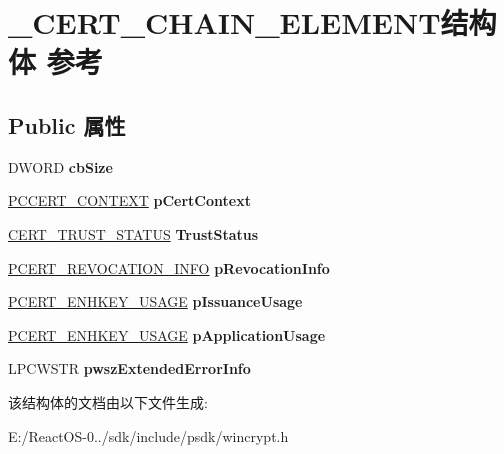\hypertarget{struct___c_e_r_t___c_h_a_i_n___e_l_e_m_e_n_t}{}\section{\+\_\+\+C\+E\+R\+T\+\_\+\+C\+H\+A\+I\+N\+\_\+\+E\+L\+E\+M\+E\+N\+T结构体 参考}
\label{struct___c_e_r_t___c_h_a_i_n___e_l_e_m_e_n_t}
\subsection*{Public 属性}
\begin{DoxyCompactItemize}
\item 
\mbox{\label{struct___c_e_r_t___c_h_a_i_n___e_l_e_m_e_n_t_a4c97d184737fedf93d6b1e325b2a3efd}} 
D\+W\+O\+RD {\bfseries cb\+Size}
\item 
\mbox{\label{struct___c_e_r_t___c_h_a_i_n___e_l_e_m_e_n_t_a64d8a3bf08c5d59ccf4c4d46cf072095}} 
\hyperlink{struct___c_e_r_t___c_o_n_t_e_x_t}{P\+C\+C\+E\+R\+T\+\_\+\+C\+O\+N\+T\+E\+XT} {\bfseries p\+Cert\+Context}
\item 
\mbox{\label{struct___c_e_r_t___c_h_a_i_n___e_l_e_m_e_n_t_ab864c5dae3d182befc1748ee7c73c1cd}} 
\hyperlink{struct___c_e_r_t___t_r_u_s_t___s_t_a_t_u_s}{C\+E\+R\+T\+\_\+\+T\+R\+U\+S\+T\+\_\+\+S\+T\+A\+T\+US} {\bfseries Trust\+Status}
\item 
\mbox{\label{struct___c_e_r_t___c_h_a_i_n___e_l_e_m_e_n_t_a25f1b263b2f47f70027a349b5d27efaf}} 
\hyperlink{struct___c_e_r_t___r_e_v_o_c_a_t_i_o_n___i_n_f_o}{P\+C\+E\+R\+T\+\_\+\+R\+E\+V\+O\+C\+A\+T\+I\+O\+N\+\_\+\+I\+N\+FO} {\bfseries p\+Revocation\+Info}
\item 
\mbox{\label{struct___c_e_r_t___c_h_a_i_n___e_l_e_m_e_n_t_a8aa7690eba349307901cb5bb7f0410e8}} 
\hyperlink{struct___c_t_l___u_s_a_g_e}{P\+C\+E\+R\+T\+\_\+\+E\+N\+H\+K\+E\+Y\+\_\+\+U\+S\+A\+GE} {\bfseries p\+Issuance\+Usage}
\item 
\mbox{\label{struct___c_e_r_t___c_h_a_i_n___e_l_e_m_e_n_t_a2c151004196e2c53c54afe27af235c20}} 
\hyperlink{struct___c_t_l___u_s_a_g_e}{P\+C\+E\+R\+T\+\_\+\+E\+N\+H\+K\+E\+Y\+\_\+\+U\+S\+A\+GE} {\bfseries p\+Application\+Usage}
\item 
\mbox{\label{struct___c_e_r_t___c_h_a_i_n___e_l_e_m_e_n_t_a74d36f56405af18fb92ffe47f5230fbe}} 
L\+P\+C\+W\+S\+TR {\bfseries pwsz\+Extended\+Error\+Info}
\end{DoxyCompactItemize}


该结构体的文档由以下文件生成\+:\begin{DoxyCompactItemize}
\item 
E\+:/\+React\+O\+S-\/0../sdk/include/psdk/wincrypt.\+h\end{DoxyCompactItemize}

